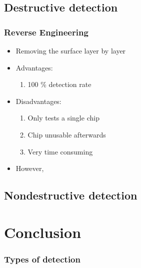 \documentclass[11pt]{beamer}
\begin{document}
\subsection{Destructive detection}
\begin{frame}
    \frametitle{Reverse Engineering}
    \begin{itemize}
        \item Removing the surface layer by layer
        \item Advantages: 
        \begin{enumerate}
            \item 100 \% detection rate
        \end{enumerate}
        \item Disadvantages:
        \begin{enumerate}
            \item Only tests a single chip
            \item Chip unusable afterwards
            \item Very time consuming
        \end{enumerate}
        \item However, 
    \end{itemize}
\end{frame}
\subsection{Nondestructive detection}
\section{Conclusion}
\begin{frame}
    \frametitle{Types of detection}
\end{frame}
\end{document}
